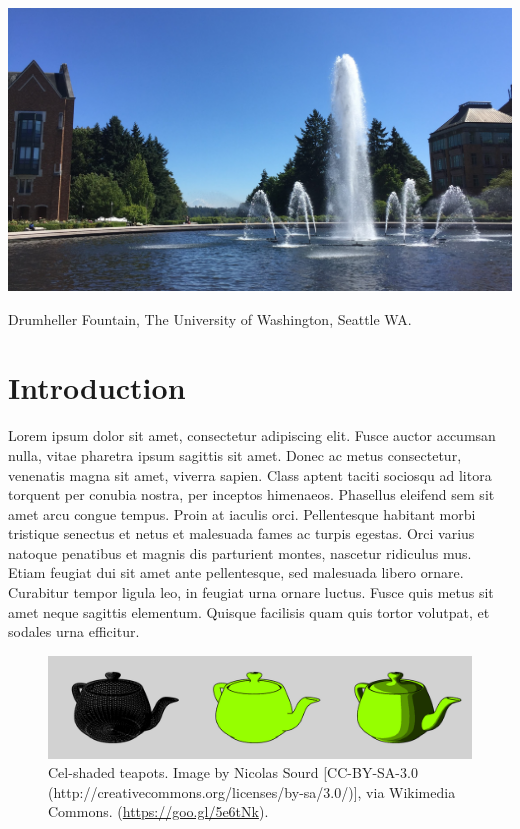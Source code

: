 \documentclass[sigconf]{acmart}
\begin{document}
\begin{teaserfigure}
  \centering
  \includegraphics[width=6.0in]{aaafiles/fountain}
  \caption{Drumheller Fountain, The University of Washington, Seattle WA.}
\end{teaserfigure}

\maketitle

\section{Introduction}

Lorem ipsum dolor sit amet, consectetur adipiscing elit. Fusce auctor accumsan nulla, vitae pharetra ipsum sagittis sit amet. \cite{Park:2006:DSI, notes2002} Donec ac metus consectetur, venenatis magna sit amet, viverra sapien. Class aptent taciti sociosqu ad litora torquent per conubia nostra, per inceptos himenaeos. Phasellus eleifend sem sit amet arcu congue tempus. Proin at iaculis orci. Pellentesque habitant morbi tristique senectus et netus et malesuada fames ac turpis egestas. Orci varius natoque penatibus et magnis dis parturient montes, nascetur ridiculus mus. \cite{Pellacini:2005:LAH} Etiam feugiat dui sit amet ante pellentesque, sed malesuada libero ornare. Curabitur tempor ligula leo, in feugiat urna ornare luctus. Fusce quis metus sit amet neque sagittis elementum. Quisque facilisis quam quis tortor volutpat, et sodales urna efficitur.

\begin{figure}[ht]
  \centering
  \includegraphics[width=\linewidth]{aaafiles/teapots}
  \caption{Cel-shaded teapots. Image by Nicolas Sourd [CC-BY-SA-3.0 (http://creativecommons.org/licenses/by-sa/3.0/)], via Wikimedia Commons. (\url{https://goo.gl/5e6tNk}).}
\end{figure}
\end{document}
